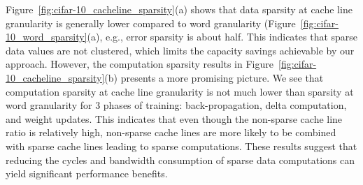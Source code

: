 Figure~\ref{fig:cifar-10_cacheline_sparsity}(a) shows that data sparsity at cache line granularity is generally lower compared to word granularity (Figure~\ref{fig:cifar-10_word_sparsity}(a), e.g., error sparsity is about half.  This indicates that sparse data values are not clustered, which limits the capacity savings achievable by our approach.  However, the computation sparsity results in Figure~\ref{fig:cifar-10_cacheline_sparsity}(b) presents a more promising picture. We see that computation sparsity at cache line granularity is not much lower than sparsity at word granularity for $3$ phases of training: back-propagation, delta computation, and weight updates. This indicates that even though the non-sparse cache line ratio is relatively high, non-sparse cache lines are more likely to be combined with sparse cache lines leading to sparse computations. These results suggest that reducing the cycles and bandwidth consumption of sparse data computations can yield significant performance benefits. 







